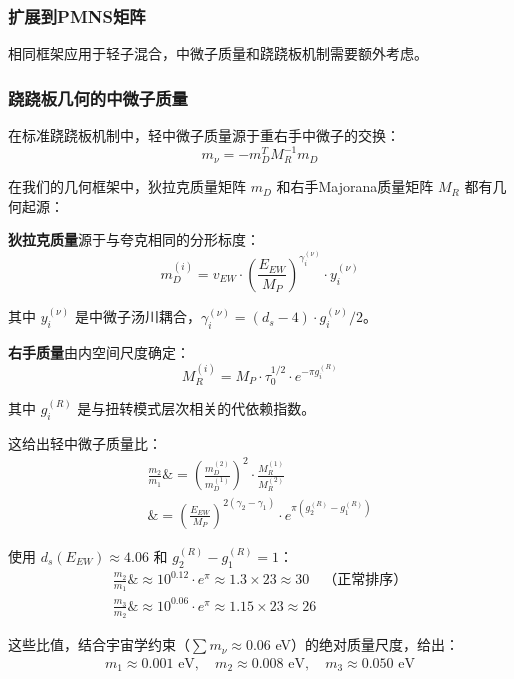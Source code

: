 \subsubsection{扩展到PMNS矩阵}

相同框架应用于轻子混合，中微子质量和跷跷板机制需要额外考虑。

\subsubsection{跷跷板几何的中微子质量}

在标准跷跷板机制中，轻中微子质量源于重右手中微子的交换：
\begin{equation}
    m_\nu = -m_D^T M_R^{-1} m_D
\end{equation}

在我们的几何框架中，狄拉克质量矩阵 $m_D$ 和右手Majorana质量矩阵 $M_R$ 都有几何起源：

\textbf{狄拉克质量}源于与夸克相同的分形标度：
\begin{equation}
    m_D^{(i)} = v_{EW} \cdot \left(\frac{E_{EW}}{M_P}\right)^{\gamma_i^{(\nu)}} \cdot y_i^{(\nu)}
\end{equation}

其中 $y_i^{(\nu)}$ 是中微子汤川耦合，$\gamma_i^{(\nu)} = (d_s - 4) \cdot g_i^{(\nu)}/2$。

\textbf{右手质量}由内空间尺度确定：
\begin{equation}
    M_R^{(i)} = M_P \cdot \tau_0^{1/2} \cdot e^{-\pi g_i^{(R)}}
\end{equation}

其中 $g_i^{(R)}$ 是与扭转模式层次相关的代依赖指数。

这给出轻中微子质量比：
\begin{align}
    \frac{m_2}{m_1} \&= \left(\frac{m_D^{(2)}}{m_D^{(1)}}\right)^2 \cdot \frac{M_R^{(1)}}{M_R^{(2)}} \\
    \&= \left(\frac{E_{EW}}{M_P}\right)^{2(\gamma_2 - \gamma_1)} \cdot e^{\pi(g_2^{(R)} - g_1^{(R)})}
\end{align}

使用 $d_s(E_{EW}) \approx 4.06$ 和 $g_2^{(R)} - g_1^{(R)} = 1$：
\begin{align}
    \frac{m_2}{m_1} \&\approx 10^{0.12} \cdot e^{\pi} \approx 1.3 \times 23 \approx 30
    \quad \text{（正常排序）} \\
    \frac{m_3}{m_2} \&\approx 10^{0.06} \cdot e^{\pi} \approx 1.15 \times 23 \approx 26
\end{align}

这些比值，结合宇宙学约束（$\sum m_\nu \approx 0.06$ eV）的绝对质量尺度，给出：
\begin{align}
    m_1 \approx 0.001 \text{ eV}, \quad m_2 \approx 0.008 \text{ eV}, \quad m_3 \approx 0.050 \text{ eV}
\end{align}

